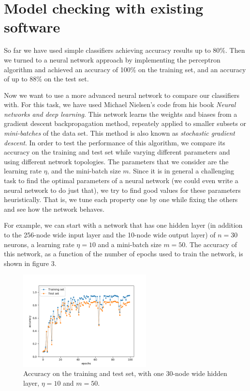 \documentclass[11pt]{article}
\begin{document}
\section{Model checking with existing software}
So far we have used simple classifiers achieving accuracy results up to 80\%. Then we turned to a neural network approach by implementing the perceptron algorithm and achieved an accuracy of 100\% on the training set, and an accuracy of up to 88\% on the test set.\par
Now we want to use a more advanced neural network to compare our classifiers with. For this task, we have used Michael Nielsen's code from his book \textit{Neural networks and deep learning}\cite{nndl}. This network learns the weights and biases from a gradient descent backpropagation method, repeately applied to smaller subsets or \textit{mini-batches} of the data set. This method is also known as \textit{stochastic gradient descent}. In order to test the performance of this algorithm, we compare its accuracy on the training and test set while varying different parameters and using different network topologies. The parameters that we consider are the learning rate $\eta$, and the mini-batch size $m$. Since it is in general a challenging task to find the optimal parameters of a neural network (we could even write a neural network to do just that), we try to find good values for these parameters heuristically. That is, we tune each property one by one while fixing the others and see how the network behaves.\par
For example, we can start with a network that has one hidden layer (in addition to the 256-node wide input layer and the 10-node wide output layer) of $n=30$ neurons, a learning rate $\eta=10$ and a mini-batch size $m=50$. The accuracy of this network, as a function of the number of epochs used to train the network, is shown in figure 3.\par
\begin{figure}[!t]
\centering
\includegraphics[width=0.6\textwidth]{accuracies_example.png}
\caption{Accuracy on the training and test set, with one 30-node wide hidden layer, $\eta=10$ and $m=50$.}
\end{figure}
\end{document}
